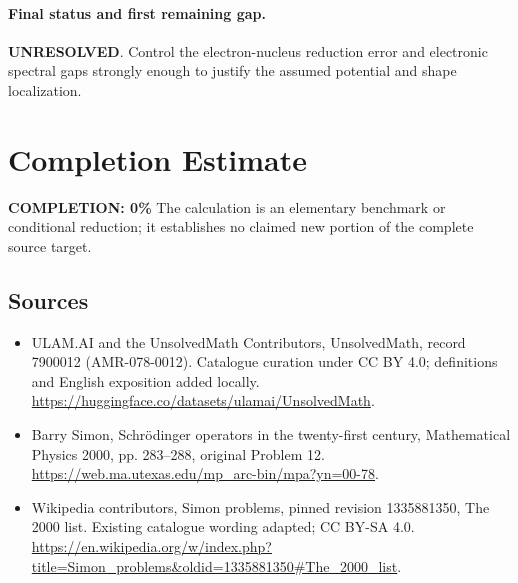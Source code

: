 \documentclass[11pt]{article}
\begin{document}
\paragraph{Final status and first remaining gap.}
\textbf{UNRESOLVED}. Control the electron-nucleus reduction error and electronic spectral gaps strongly enough to justify the assumed potential and shape localization.

\section{Completion Estimate}
\noindent\textbf{COMPLETION: 0\%}
The calculation is an elementary benchmark or conditional reduction; it establishes no claimed new portion of the complete source target.

\subsection{Sources}
\begin{itemize}
\item[\hypertarget{source:7900012:1}{S1}] ULAM.AI and the UnsolvedMath Contributors, UnsolvedMath, record 7900012 (AMR-078-0012). Catalogue curation under CC BY 4.0; definitions and English exposition added locally.
\url{https://huggingface.co/datasets/ulamai/UnsolvedMath}.
\item[\hypertarget{source:7900012:2}{S2}] Barry Simon, Schrödinger operators in the twenty-first century, Mathematical Physics 2000, pp. 283–288, original Problem 12.
\url{https://web.ma.utexas.edu/mp_arc-bin/mpa?yn=00-78}.
\item[\hypertarget{source:7900012:3}{S3}] Wikipedia contributors, Simon problems, pinned revision 1335881350, The 2000 list. Existing catalogue wording adapted; CC BY-SA 4.0.
\url{https://en.wikipedia.org/w/index.php?title=Simon_problems&oldid=1335881350#The_2000_list}.
\end{itemize}
\label{end:7900012}
\end{document}
